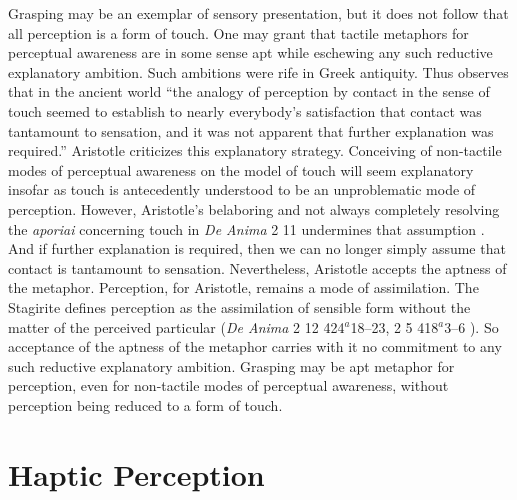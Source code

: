 \documentclass[12pt]{article}
\begin{document}
Grasping may be an exemplar of sensory presentation, but it does not follow that all perception is a form of touch. One may grant that tactile metaphors for perceptual awareness are in some sense apt while eschewing any such reductive explanatory ambition. Such ambitions were rife in Greek antiquity. Thus \citet[39]{Lindberg:1977aa} observes that in the ancient world ``the analogy of perception by contact in the sense of touch seemed to establish to nearly everybody’s satisfaction that contact was tantamount to sensation, and it was not apparent that further explanation was required.'' Aristotle criticizes this explanatory strategy. Conceiving of non-tactile modes of perceptual awareness on the model of touch will seem explanatory insofar as touch is antecedently understood to be an unproblematic mode of perception. However, Aristotle's belaboring and not always completely resolving the \emph{aporiai} concerning touch in \emph{De Anima} 2 11 undermines that assumption \citep{Derrida:2005aa,Kalderon:2015fr}. And if further explanation is required, then we can no longer simply assume that contact is tantamount to sensation. Nevertheless, Aristotle accepts the aptness of the metaphor. Perception, for Aristotle, remains a mode of assimilation. The Stagirite defines perception as the assimilation of sensible form without the matter of the perceived particular (\emph{De Anima} 2 12 424\( ^{a} \)18–23, 2 5 418\( ^{a} \)3–6 ). So acceptance of the aptness of the metaphor carries with it no commitment to any such reductive explanatory ambition. Grasping may be apt metaphor for perception, even for non-tactile modes of perceptual awareness, without perception being reduced to a form of touch.


\section{Haptic Perception} %
\label{sec:haptic_perception}

\end{document}

